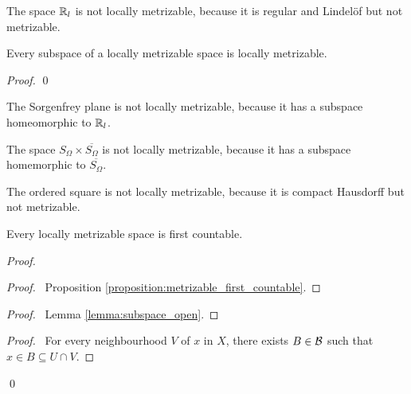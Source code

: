 \begin{example}
    The space $\mathbb{R}_l$ is not locally metrizable, because it is regular and Lindel\"{o}f but not metrizable.
\end{example}

\begin{proposition}
    Every subspace of a locally metrizable space is locally metrizable.
\end{proposition}

\begin{proof}
    \pf
    \qed
\end{proof}

\begin{corollary}
    The Sorgenfrey plane is not locally metrizable, because it has a subspace homeomorphic to $\mathbb{R}_l$.
\end{corollary}

\begin{example}
    The space $S_\Omega \times \overline{S_\Omega}$ is not locally metrizable, because it has a subspace homemorphic to
    $\overline{S_\Omega}$.    
\end{example}

\begin{example}
    The ordered square is not locally metrizable, because it is compact Hausdorff but not metrizable.
\end{example}

\begin{proposition}
    Every locally metrizable space is first countable.
\end{proposition}

\begin{proof}
    \pf
    \begin{proof}
        \pf\ Proposition \ref{proposition:metrizable_first_countable}.
    \end{proof}
    \begin{proof}
        \pf\ Lemma \ref{lemma:subspace_open}.
    \end{proof}
    \begin{proof}
        \pf\ For every neighbourhood $V$ of $x$ in $X$, there exists $B \in \mathcal{B}$
        such that $x \in B \subseteq U \cap V$.
    \end{proof}
    \qed
\end{proof}

